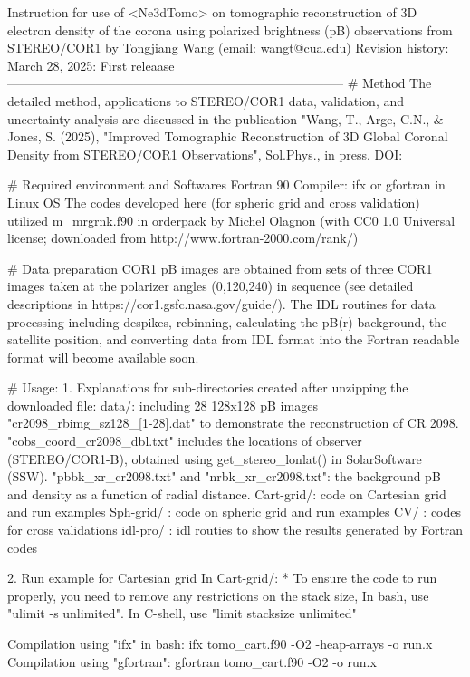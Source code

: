 Instruction for use of <Ne3dTomo> on tomographic reconstruction of 
 3D electron density of the corona using polarized brightness (pB) observations 
 from STEREO/COR1
 by Tongjiang Wang (email: wangt@cua.edu)
Revision history:
  March 28, 2025: First releaase
--------------------------------------------------------------------------------
 # Method
 The detailed method, applications to STEREO/COR1 data, validation, and uncertainty 
 analysis are discussed in the publication "Wang, T., Arge, C.N., & Jones, S. (2025), 
 "Improved Tomographic Reconstruction of 3D Global Coronal Density from STEREO/COR1 
 Observations", Sol.Phys., in press. DOI:

 # Required environment and Softwares
  Fortran 90 Compiler: ifx or gfortran in Linux OS
  The codes developed here (for spheric grid and cross validation) utilized m_mrgrnk.f90 
  in orderpack by Michel Olagnon (with CC0 1.0 Universal license; downloaded
  from http://www.fortran-2000.com/rank/)

 # Data preparation
   COR1 pB images are obtained from sets of three COR1 images taken at the polarizer angles
  (0,120,240) in sequence (see detailed descriptions in https://cor1.gsfc.nasa.gov/guide/).
   The IDL routines for data processing including despikes, rebinning, calculating the pB(r)
   background, the satellite position, and converting data from IDL format into the Fortran 
   readable format will become available soon.

 # Usage:
   1. Explanations for sub-directories created after unzipping the downloaded file:
    data/: including 28 128x128 pB images "cr2098_rbimg_sz128_[1-28].dat" to demonstrate the
           reconstruction of CR 2098. "cobs_coord_cr2098_dbl.txt" includes the locations of 
           observer (STEREO/COR1-B), obtained using get_stereo_lonlat() in SolarSoftware (SSW).
           "pbbk_xr_cr2098.txt" and "nrbk_xr_cr2098.txt": the background pB and density as a
           function of radial distance.
    Cart-grid/: code on Cartesian grid and run examples
    Sph-grid/ : code on spheric grid and run examples
    CV/       : codes for cross validations
    idl-pro/  : idl routies to show the results generated by Fortran codes

  2. Run example for Cartesian grid
    In Cart-grid/:
    * To ensure the code to run properly, you need to remove any restrictions on the stack size,
    In bash, use "ulimit -s unlimited". In C-shell, use "limit stacksize unlimited"

    Compilation using "ifx" in bash:
     ifx tomo_cart.f90 -O2 -heap-arrays -o run.x
    Compilation using "gfortran":
     gfortran tomo_cart.f90 -O2  -o run.x

